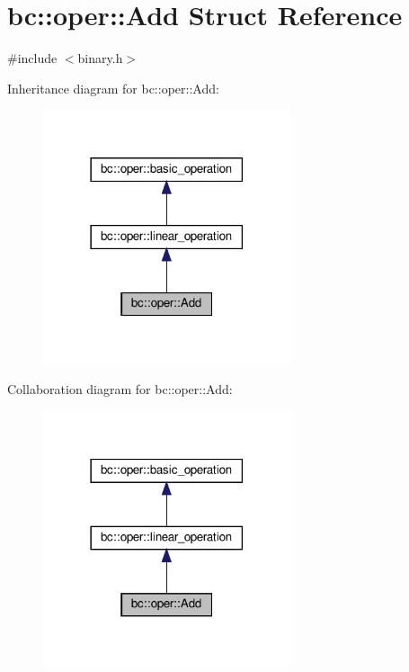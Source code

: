 \hypertarget{structbc_1_1oper_1_1Add}{}\section{bc\+:\+:oper\+:\+:Add Struct Reference}
\label{structbc_1_1oper_1_1Add}


{\ttfamily \#include $<$binary.\+h$>$}



Inheritance diagram for bc\+:\+:oper\+:\+:Add\+:\nopagebreak
\begin{figure}[H]
\begin{center}
\leavevmode
\includegraphics[width=206pt]{structbc_1_1oper_1_1Add__inherit__graph}
\end{center}
\end{figure}


Collaboration diagram for bc\+:\+:oper\+:\+:Add\+:\nopagebreak
\begin{figure}[H]
\begin{center}
\leavevmode
\includegraphics[width=206pt]{structbc_1_1oper_1_1Add__coll__graph}
\end{center}
\end{figure}
